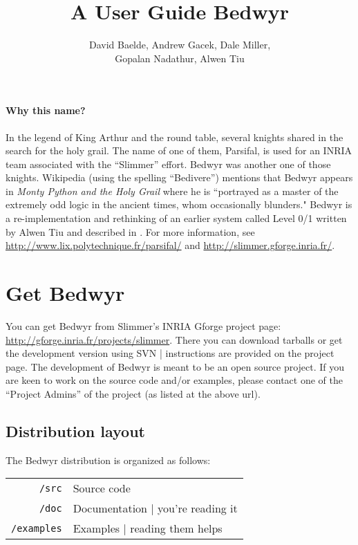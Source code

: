 \documentclass{article}
\title{{\Huge A User Guide Bedwyr}
}
\author{David Baelde, Andrew Gacek, Dale Miller, \\
        Gopalan Nadathur, Alwen Tiu}
\begin{document}
\maketitle

\tableofcontents

\vfill

\paragraph{Why this name?}
In the legend of King Arthur and the round table, several knights
shared in the search for the holy grail.  The name of one of them,
Parsifal, is used for an INRIA team associated with the ``Slimmer''
effort.  Bedwyr was another one of those knights.  Wikipedia (using
the spelling ``Bedivere'') mentions that Bedwyr appears in {\em Monty
Python and the Holy Grail} where he is ``portrayed as a master of the
extremely odd logic in the ancient times, whom occasionally blunders."
Bedwyr is a re-implementation and rethinking of an earlier system
called Level 0/1 written by Alwen Tiu and described in
\cite{tiu05eshol}.  For more information, see
\url{http://www.lix.polytechnique.fr/parsifal/} and
\url{http://slimmer.gforge.inria.fr/}.


\newpage
\section{Get Bedwyr}
\label{sec:install}

You can get Bedwyr from Slimmer's INRIA Gforge project page:
\url{http://gforge.inria.fr/projects/slimmer}.
There you can download tarballs or get the development version using SVN
| instructions are provided on the project page.  The development of
Bedwyr is meant to be an open source project.  If you are keen
to work on the source code and/or examples, please contact
one of the ``Project Admins'' of the project (as listed at the above url).

\subsection{Distribution layout}

The Bedwyr distribution is organized as follows:

\begin{tabular}{r@{\quad}l}
  \texttt{/src}      & Source code \\
  \texttt{/doc}      &  Documentation | you're reading it \\
  \texttt{/examples} &  Examples | reading them helps
\end{tabular}
\end{document}
